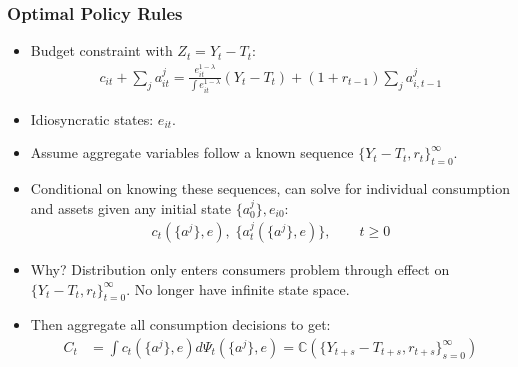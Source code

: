 \documentclass[english,xcolor=svgnames]{beamer}
\begin{document}
\begin{frame}
    \frametitle{Optimal Policy Rules}
    \begin{itemize}
        \item Budget constraint with $Z_t=Y_t-T_t$:
        \begin{align*}
        	c_{it} + \sum_j a_{it}^j = \frac{e_{it}^{1-\lambda}}{\int e_{it}^{1-\lambda}} (Y_t-T_t) + (1+r_{t-1})\sum_j a_{i,t-1}^j
        \end{align*}
        \item Idiosyncratic states: $e_{it}$.
        \item Assume aggregate variables follow a known sequence $\{Y_t-T_t, r_t\}_{t=0}^{\infty}$.
        \item Conditional on knowing these sequences, can solve for individual consumption and assets given any initial state $\{a_0^j\},e_{i0}$:
        \begin{align*}
        	c_t(\{a^j\},e),\;\{a_t^j(\{a^j\},e)\},\qquad t\ge 0
        \end{align*}
        \item Why? Distribution only enters consumers problem through effect on $\{Y_t-T_t, r_t\}_{t=0}^{\infty}$. No longer have infinite state space.
        \item Then aggregate all consumption decisions to get:
        \begin{align*}
            C_t &=\int c_t(\{a^j\},e) d\Psi_t(\{a^j\},e) =  \mathbb{C}(\{Y_{t+s}-T_{t+s},r_{t+s}\}_{s=0}^{\infty})
        \end{align*}
	\end{itemize}
\end{frame}
\end{document}
